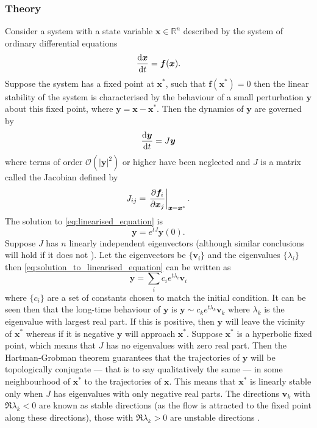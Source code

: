 \subsubsection{Theory}
Consider a system with a state variable $\bm{x} \in \mathbb{R}^n$ described by the system of ordinary  differential equations
\begin{equation}
  \label{eq:generic_system}
  \dv{\bm{x}}{t} = \bm{f}(\bm{x}).
\end{equation}
Suppose the system has a fixed point at $\bm{x}^*$, such that $\bm{f}(\bm{x}^*)=0$ then the linear stability of the system \parencite{Strogatz2015} is characterised by
the behaviour of a small perturbation $\bm{y}$ about this fixed point, where $\bm{y} = \bm{x} - \bm{x}^*$. Then the dynamics of $\bm{y}$ are governed by
\begin{equation}
  \label{eq:linearised_equation}
  \dv{\bm{y}}{t} = J\bm{y} 
\end{equation}
where terms of order $\mathcal{O}\left(\left|\bm{y}\right|^2\right)$ or higher have been neglected and $J$ is a matrix called the Jacobian defined by
\begin{equation}
  \label{eq:jacobian}
  J_{ij} = \eval{\pdv{\bm{f}_i}{\bm{x}_j}}_{\bm{x}=\bm{x}^*}.
\end{equation}
The solution to \cref{eq:linearised_equation} is
\begin{equation}
  \label{eq:solution_to_linearised_equation}
  \bm{y} = e^{tJ}\bm{y}(0).
\end{equation}
Suppose $J$ has $n$ linearly independent eigenvectors (although similar conclusions will hold if it does not \parencite{guckenheimer2013}).
Let the eigenvectors be $\{\bm{v}_i\}$ and the eigenvalues $\{\lambda_i\}$ then \cref{eq:solution_to_linearised_equation} can be written as
\begin{equation}
  \label{eq:solution_to_linearised_equation_eigen}
  \bm{y} = \sum_i c_i e^{t\lambda_i}\bm{v}_i
\end{equation}
where $\{c_i\}$ are a set of constants chosen to match the initial condition. It can be seen then that the long-time behaviour of $\bm{y}$ is
$\bm{y} \sim c_k e^{t\lambda_k} \bm{v}_k$ where $\lambda_k$ is the eigenvalue with largest real part. If this is positive, then $\bm{y}$ will leave the vicinity of $\bm{x}^*$ whereas
if it is negative $\bm{y}$ will approach $\bm{x}^*$. Suppose $\bm{x}^*$ is a hyperbolic fixed point, which means that $J$ has no eigenvalues with zero real part. Then the Hartman-Grobman theorem
\parencite{Grobman1959,Hartman1960,Hartman1963} guarantees that the trajectories of $\bm{y}$ will be topologically conjugate --- that is to say qualitatively the same --- in some
neighbourhood of $\bm{x}^*$ to the trajectories of $\bm{x}$.  This means that $\bm{x}^*$ is linearly stable only when $J$ has eigenvalues with only negative real parts.
The directions $\bm{v}_k$ with $\Re \lambda_k < 0$ are known as stable directions (as the flow is attracted to the fixed point along these directions),
those with $\Re \lambda_k > 0$ are unstable directions \parencite{Strogatz2015}.

